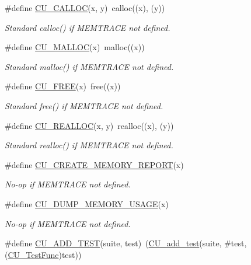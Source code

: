 \begin{DoxyCompactItemize}
\item 
\#define \hyperlink{group__Framework_gaef1d8826851fd285cc3961461713d2ad}{C\-U\-\_\-\-C\-A\-L\-L\-O\-C}(x, y)~calloc((x), (y))
\begin{DoxyCompactList}\small\item\em Standard calloc() if M\-E\-M\-T\-R\-A\-C\-E not defined. \end{DoxyCompactList}\item 
\#define \hyperlink{group__Framework_gaf3c485ccdf034c746dbd00a05940c819}{C\-U\-\_\-\-M\-A\-L\-L\-O\-C}(x)~malloc((x))
\begin{DoxyCompactList}\small\item\em Standard malloc() if M\-E\-M\-T\-R\-A\-C\-E not defined. \end{DoxyCompactList}\item 
\#define \hyperlink{group__Framework_ga24a922b67c81baa3d7821fb425e094f4}{C\-U\-\_\-\-F\-R\-E\-E}(x)~free((x))
\begin{DoxyCompactList}\small\item\em Standard free() if M\-E\-M\-T\-R\-A\-C\-E not defined. \end{DoxyCompactList}\item 
\#define \hyperlink{group__Framework_ga60067c844199888e97bb2a63411a2a88}{C\-U\-\_\-\-R\-E\-A\-L\-L\-O\-C}(x, y)~realloc((x), (y))
\begin{DoxyCompactList}\small\item\em Standard realloc() if M\-E\-M\-T\-R\-A\-C\-E not defined. \end{DoxyCompactList}\item 
\#define \hyperlink{group__Framework_ga87f2f74a75005dff52cf8f3950dace7f}{C\-U\-\_\-\-C\-R\-E\-A\-T\-E\-\_\-\-M\-E\-M\-O\-R\-Y\-\_\-\-R\-E\-P\-O\-R\-T}(x)
\begin{DoxyCompactList}\small\item\em No-\/op if M\-E\-M\-T\-R\-A\-C\-E not defined. \end{DoxyCompactList}\item 
\#define \hyperlink{group__Framework_ga08a41107806ccf43676758c0dea5d3b2}{C\-U\-\_\-\-D\-U\-M\-P\-\_\-\-M\-E\-M\-O\-R\-Y\-\_\-\-U\-S\-A\-G\-E}(x)
\begin{DoxyCompactList}\small\item\em No-\/op if M\-E\-M\-T\-R\-A\-C\-E not defined. \end{DoxyCompactList}\item 
\#define \hyperlink{group__Framework_ga2d4a4721607c68a97f61ff1c25abfe21}{C\-U\-\_\-\-A\-D\-D\-\_\-\-T\-E\-S\-T}(suite, test)~(\hyperlink{group__Framework_gad9f198a8a5fa8cc6870c3c8be873869f}{C\-U\-\_\-add\-\_\-test}(suite, \#test, (\hyperlink{group__Framework_ga5868148b642b30635b8fe7f095c5b493}{C\-U\-\_\-\-Test\-Func})test))

\end{DoxyCompactItemize}
